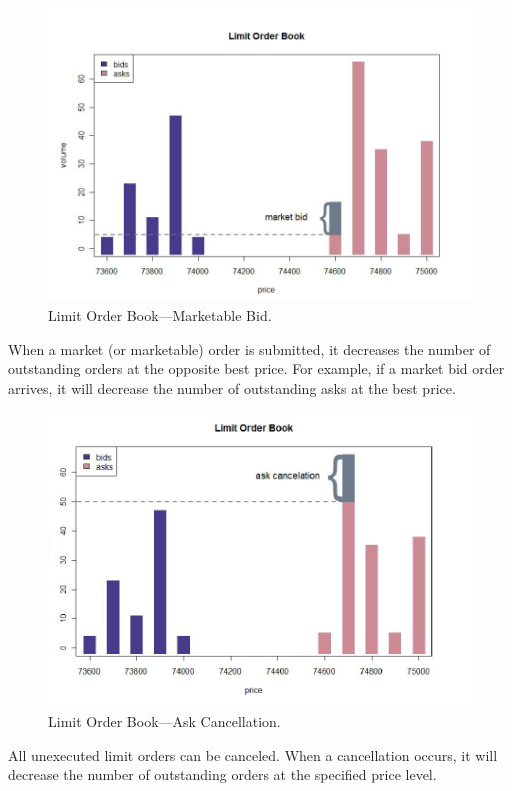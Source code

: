 	\begin{figure}[!ht]
	   \centering
	   \includegraphics[width=\textwidth]{chapters/chapter_trading_fund/figures/limitbk2.png} 
	   \caption{Limit Order Book---Marketable Bid. \label{fig:limbk2}}
	\end{figure}
	
When a market (or marketable) order is submitted, it decreases the number of outstanding orders at the opposite best price. For example, if a market bid order arrives, it will decrease the number of outstanding asks at the best price.
	\begin{figure}[!ht]
	   \centering
	   \includegraphics[width=\textwidth]{chapters/chapter_trading_fund/figures/limitbk3.png} 
	   \caption{Limit Order Book---Ask Cancellation. \label{fig:limbk3}}
	\end{figure}
All unexecuted limit orders can be canceled. When a cancellation occurs, it will decrease the number of outstanding orders at the specified price level.


